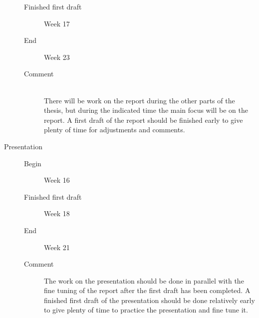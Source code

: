 \documentclass[a4paper,11pt]{report}
\begin{document}
\begin{description}
\begin{description}
            \item[Finished first draft] Week 17
            \item[End] Week 23
            \item[Comment]\hfill \\
                There will be work on the report during the other parts of the
                thesis, but during the indicated time the main focus will be 
                on the report. A first draft of the report should be finished
                early to give plenty of time for adjustments and comments.
        \end{description}
    \item[Presentation] \hfill
        \begin{description}
            \item[Begin] Week 16
            \item[Finished first draft] Week 18
            \item[End] Week 21
            \item[Comment] The work on the presentation should be done in
                parallel with the fine tuning of the report after the first 
                draft has been completed. A finished first draft of the 
                presentation should be done relatively early to give plenty
                of time to practice the presentation and fine tune it.
        \end{description}
\end{description}

{}

\end{document}
